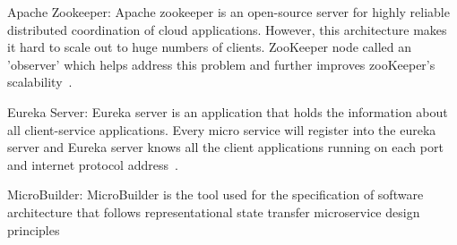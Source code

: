 \par Apache Zookeeper: Apache zookeeper is an open-source server for highly reliable distributed coordination of cloud applications. However, this architecture makes it hard to scale out to huge numbers of clients. ZooKeeper node called an 'observer' which helps address this problem and further improves zooKeeper's scalability~\cite{Kalske2017, KalskeM2017}.

\par Eureka Server: Eureka server is an application that holds the information about all client-service applications. Every micro service will register into the eureka server and Eureka server knows all the client applications running on each port and internet protocol address~\cite{Uber}.

\par MicroBuilder: MicroBuilder is the tool used for the specification of software architecture that follows representational state transfer microservice design principles~\cite{Branko2018} 



